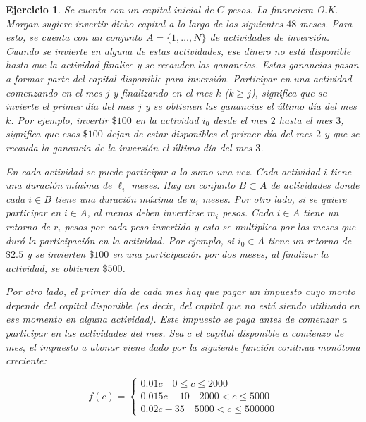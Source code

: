 \documentclass[a4paper,oneside,12pt]{amsart}
\newtheorem{quest}{Ejercicio}
\begin{document}
\begin{quest} 
Se cuenta con un capital inicial de $C$ pesos. La financiera O.K. Morgan sugiere invertir dicho capital a lo largo de los siguientes $48$ meses. Para esto, se cuenta con un conjunto ${A=\{1, \dots, N\}}$ de actividades de inversión. Cuando se invierte en alguna de estas actividades, ese dinero no está disponible hasta que la actividad finalice y se recauden las ganancias. Estas ganancias pasan a formar parte del capital disponible para inversión. Participar en una actividad comenzando en el mes $j$ y finalizando en el mes $k$ ($k\geq j$), significa que se invierte el primer día del mes $j$ y se obtienen las ganancias el último día del mes $k$. Por ejemplo, invertir $\$100$ en la actividad $i_0$ desde el mes $2$ hasta el mes $3$, significa que esos $\$100$ dejan de estar disponibles el primer día del mes $2$ y que se recauda la ganancia de la inversión el último día del mes $3$. 

En cada actividad se puede participar a lo sumo una vez. Cada actividad $i$ tiene una duración 
mínima de $\ell_i$ meses. Hay un conjunto $B\subset A$ de actividades donde cada $i\in B$ tiene una duración máxima de $u_i$ meses. 
Por otro lado, si se quiere participar en $i\in A$, al menos deben invertirse $m_i$ pesos.
Cada $i\in A$ tiene un retorno de $r_i$ pesos por cada peso invertido y esto se multiplica por los meses que duró la participación en la actividad. Por ejemplo, si $i_0\in A$ tiene un retorno de $\$2.5$ y se invierten $\$100$ en una participación por dos meses, al finalizar la actividad, se obtienen $\$500$.

Por otro lado, el primer día de cada mes hay que pagar un impuesto cuyo monto depende del capital disponible (es decir, del capital que no está siendo utilizado en ese momento en alguna actividad). Este impuesto se paga antes de comenzar a participar en las actividades del mes. Sea $c$ el capital disponible a comienzo de mes, el impuesto a abonar viene dado por la siguiente función conitnua monótona creciente:

\[f(c)=\begin{cases}
0.01c \quad 0\leq c \leq 2000 \\
0.015c - 10 \quad 2000 < c \leq 5000 \\
0.02c - 35 \quad 5000 < c \leq 500000
\end{cases}\]


\end{quest}
\end{document}
